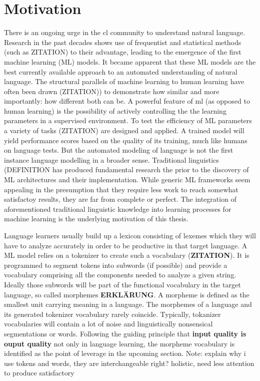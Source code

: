 \documentclass[english]{ttlab-qualify}
\begin{document}
    \section{Motivation}
    There is an ongoing urge in the \acf{cl} community to understand natural language.
    Research in the past decades shows use of frequentist and statistical methods (such as \uppercase{ZITATION}) to their advantage, leading to the emergence of the first machine learning (ML) models.
    It became apparent that these ML models are the best currently available approach to an automated understanding of natural language.
    The structural parallels of machine learning to human learning have often been drawn (\uppercase{zitation)}) to demonstrate how similar and more importantly: how different both can be.
    A powerful feature of \ac{ml} (as opposed to human learning) is the possibility of actively controlling the the learning parameters in a supervised environment.
    To test the efficiency of \uppercase{ML} parameters a variety of tasks (\uppercase{zitation}) are designed and applied.
    A trained model will yield performance scores based on the quality of its training, much like humans on language tests.
    But the automated modeling of language is not the first instance language modelling in a broader sense.
    Traditional linguistics (\uppercase{definition} has produced fundamental research the prior to the discovery of \uppercase{ML} architectures and their implementation.
    While generic ML frameworks seem appealing in the presumption that they require less work to reach somewhat satisfactoy results,
    they are far from complete or perfect. The integration of aforementioned traditional linguistic knowledge into learning processes for machine learning is the underlying motivation of this thesis.

    Language learners usually build up a lexicon consisting of lexemes which they will have to analyze accurately in order to be productive in that target language.
    A ML model relies on a tokenizer to create such a vocabulary  (\textbf{ZITATION}).
    It is programmed to segment tokens into subwords (if possible) and provide a vocabulary comprising all the components needed to analyze a given string.
    Ideally those subwords will be part of the functional vocabulary in the target language, so called morphemes \textbf{ERKLÄRUNG}.
    A morpheme is defined as the smallest unit carrying meaning in a language.
    The morphemes of a language and its generated tokenizer vocabulary rarely coincide.
    Typically, tokanizer vocabularies will contain a lot of noise and linguistically nonsensical segmentations or words.
    Following the guiding principle that \textbf{input quality is ouput quality} not only in language learning, the morpheme vocabulary is identified as the point of leverage in the upcoming section.
    Note: explain why i use tokens and words, they are interchangeable right?
    holistic, need less attention to produce satisfactory
    
\end{document}
